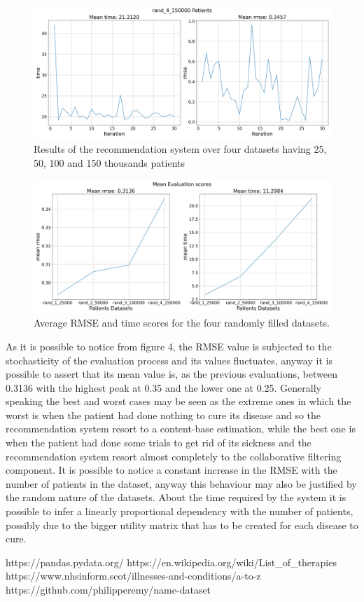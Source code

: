 \begin{figure}[h]
		\includegraphics[width=\columnwidth]{../results/Stats/rand_4_150000_patients_rmse_and_time.png}
		\caption{Results of the recommendation system over four datasets having
				 25, 50, 100 and 150 thousands patients}
\end{figure}
\begin{figure}[h]
		\centering
		\includegraphics[width=\columnwidth]{../results/Stats/Evaluation_metrics_summary.png}
		\caption{Average RMSE and time scores for the four randomly filled
				 datasets.}
\end{figure}
\newpage
As it is possible to notice from figure 4, the RMSE value is subjected to the
stochasticity of the evaluation process and its values fluctuates, anyway it is
possible to assert that its mean value is, as the previous evaluations,
between
0.3136 with the highest peak at 0.35 and the lower one at 0.25.
Generally speaking the best and
worst cases may be seen as the extreme ones in which the worst is when the
patient had done nothing to cure its disease and so the recommendation system
resort to a content-base estimation, while the best one is when the patient
had done some trials to get rid of its sickness and the recommendation system
resort almost completely to the collaborative filtering component.
It is possible to notice a constant increase in the RMSE with the number of
patients in the dataset, anyway this behaviour may also be justified by the
random nature of the datasets.
About the time required by the system it is possible to infer a linearly
proportional dependency with the number of patients, possibly due to the bigger
utility matrix that has to be created for each disease to cure.
\clearpage

\begin{thebibliography}{9}
				https://pandas.pydata.org/
				https://en.wikipedia.org/wiki/List\_of\_therapies
				https://www.nhsinform.scot/illnesses-and-conditions/a-to-z
				https://github.com/philipperemy/name-dataset
\end{thebibliography}
